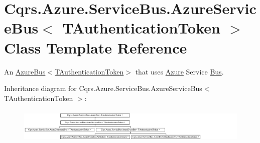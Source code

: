 \hypertarget{classCqrs_1_1Azure_1_1ServiceBus_1_1AzureServiceBus}{}\section{Cqrs.\+Azure.\+Service\+Bus.\+Azure\+Service\+Bus$<$ T\+Authentication\+Token $>$ Class Template Reference}
\label{classCqrs_1_1Azure_1_1ServiceBus_1_1AzureServiceBus}


An \hyperlink{classCqrs_1_1Azure_1_1ServiceBus_1_1AzureBus_a1046ff74282fd178f43e28420433d2a9_a1046ff74282fd178f43e28420433d2a9}{Azure\+Bus$<$\+T\+Authentication\+Token$>$} that uses \hyperlink{namespaceCqrs_1_1Azure}{Azure} Service \hyperlink{namespaceCqrs_1_1Bus}{Bus}.  


Inheritance diagram for Cqrs.\+Azure.\+Service\+Bus.\+Azure\+Service\+Bus$<$ T\+Authentication\+Token $>$\+:\begin{figure}[H]
\begin{center}
\leavevmode
\includegraphics[height=1.689291cm]{classCqrs_1_1Azure_1_1ServiceBus_1_1AzureServiceBus}
\end{center}
\end{figure}
